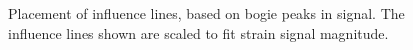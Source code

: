 \begin{figure}[htbp]
	\centering
	
	\caption{Placement of influence lines, based on bogie peaks in signal. The influence lines shown are scaled to fit strain signal magnitude.}
	\label{fig:placing_influencelines}
\end{figure}


%
% 		
% 		
% 		
%
%
